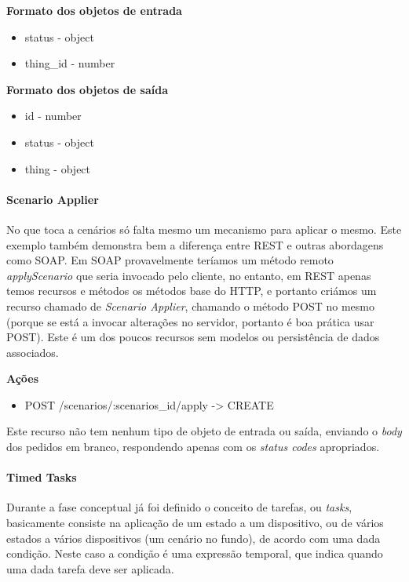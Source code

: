 \textbf{Formato dos objetos de entrada}
\begin{itemize}
    \item status - object
    \item thing\_id - number
\end{itemize}

\textbf{Formato dos objetos de saída}
\begin{itemize}
    \item id - number
    \item status - object
    \item thing - object
\end{itemize}

\paragraph*{Scenario Applier}

No que toca a cenários só falta mesmo um mecanismo para aplicar o mesmo. Este exemplo também demonstra bem a diferença entre REST e outras abordagens como SOAP. Em SOAP provavelmente teríamos um método remoto \textit{applyScenario} que seria invocado pelo cliente, no entanto, em REST apenas temos recursos e métodos os métodos base do HTTP, e portanto criámos um recurso chamado de \textit{Scenario Applier}, chamando o método POST no mesmo (porque se está a invocar alterações no servidor, portanto é boa prática usar POST). Este é um dos poucos recursos sem modelos ou persistência de dados associados.

\textbf{Ações}
\begin{itemize}
    \item POST /scenarios/:scenarios\_id/apply -> CREATE
\end{itemize}

Este recurso não tem nenhum tipo de objeto de entrada ou saída, enviando o \textit{body} dos pedidos em branco, respondendo apenas com os \textit{status codes} apropriados.

\paragraph*{Timed Tasks}

Durante a fase conceptual já foi definido o conceito de tarefas, ou \textit{tasks}, basicamente consiste na aplicação de um estado a um dispositivo, ou de vários estados a vários dispositivos (um cenário no fundo), de acordo com uma dada condição. Neste caso a condição é uma expressão temporal, que indica quando uma dada tarefa deve ser aplicada.


